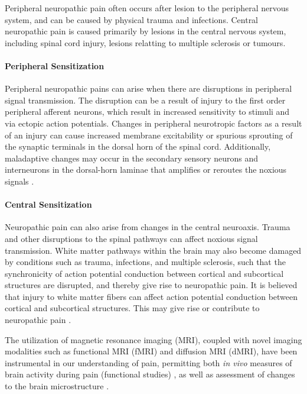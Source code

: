 Peripheral neuropathic pain often occurs after lesion to the peripheral nervous system, and can be caused by physical trauma and infections. Central neuropathic pain is caused primarily by lesions in the central nervous system, including spinal cord injury, lesions relatting to multiple sclerosis or tumours. 


\paragraph{Peripheral Sensitization}

Peripheral neuropathic pains can arise when there are disruptions in peripheral signal transmission. The disruption can be a result of injury to the first order peripheral afferent neurons, which result in increased sensitivity to stimuli and via ectopic action potentials. Changes in peripheral neurotropic factors as a result of an injury can cause increased membrane excitability or spurious sprouting of the synaptic terminals in the dorsal horn of the spinal cord. Additionally, maladaptive changes may occur in the secondary sensory neurons and interneurons in the dorsal-horn laminae that amplifies or reroutes the noxious signals \cite{Elmes2004}.

\paragraph{Central Sensitization}

Neuropathic pain can also arise from changes in the central neuroaxis. Trauma and other disruptions to the spinal pathways can affect noxious signal transmission. White matter pathways within the brain may also become damaged by conditions such as trauma, infections, and multiple sclerosis, such that the synchronicity of action potential conduction between cortical and subcortical structures are disrupted, and thereby give rise to neuropathic pain. It is believed that injury to white matter fibers can affect action potential conduction between cortical and subcortical structures. This may give rise or contribute to neuropathic pain \cite{Geha2008}.

 The utilization of magnetic resonance imaging (MRI), coupled with novel imaging modalities such as functional MRI (fMRI) and diffusion MRI (dMRI), have been instrumental in our understanding of pain, permitting both \textit{in vivo} measures of brain activity during pain (functional studies) \cite{Davis2006}, as well as assessment of changes to the brain microstructure \cite{Hodaie2009a,Chen2015c}.
 
